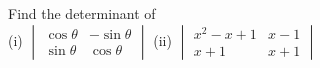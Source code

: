 \begin{flushleft}
Find the determinant of \\
\vspace{20pt}
(i) $ \begin{vmatrix}
\cos\theta& -\sin\theta\\ \sin\theta& \cos\theta 
\end{vmatrix} $ 
(ii) $ \begin{vmatrix}
x^2-x+1& x-1\\ x+1&  x+1
\end{vmatrix} $
\end{flushleft}
